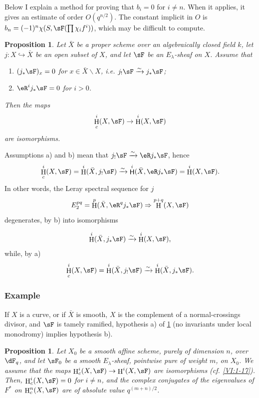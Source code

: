 \documentclass[oneside]{book}
\DeclareMathOperator{\h}{H}
\DeclareMathOperator{\hh}{\mathsf{H}} %
\newcommand{\iso}{\xrightarrow\sim}
\renewcommand{\setminus}{\smallsetminus}
\theoremstyle{sga-source}
\theoremstyle{sga-source-dash}
\theoremstyle{sga-source-dotdash}
\theoremstyle{sga-source-number-note-dash}
\theoremstyle{sga-source-note-number-dotdash}
\theoremstyle{sga-source-example-dotdash}
\theoremstyle{sga-source-inline-number}
\theoremstyle{sga-source-bare-number}
\theoremstyle{sga-source}
\newtheorem{proposition_}[subsection]{Proposition}
\newcommand{\PrintPage}[1]{}\newcommand{\MathPage}[1]{}\newcommand{\PrintCite}[2]{#1}\newcommand{\var}[3]{#1}
\begin{document}
Below I explain a method for proving that $b_i=0$ for $i\ne n$. 
When it applies, it gives an estimate of order $O(q^{n/2})$. The constant 
implicit in $O$ is $b_n=(-1)^n \chi(S,\sF(\prod \chi_i f^i))$, which may 
be difficult to compute. 





\begin{proposition_}\label{VI:1-19}
Let $\bar X$ be a proper scheme over an algebraically closed field $k$, 
let $j:X\hookrightarrow \bar X$ be \var{an open subset of $X$}{an open subset of $\bar X$}{S45-SOL-0719}, and let $\sF$ be an $E_\lambda$-sheaf 
on $X$. Assume that 
\begin{enumerate}[\indent a)]
  \item $(j_\ast\sF)_x = 0$ for $x\in \bar X\setminus X$, i.e. 
    $j_!\sF\iso j_\ast\sF$; 
  \item $\eR^i j_\ast \sF = 0$ for $i>0$.
\end{enumerate}
Then the maps 
\[
  \h_c^i(X,\sF) \to \h^i(X,\sF)
\]
are isomorphisms. 
\end{proposition_}

Assumptions a) and b) mean that $j_! \sF \iso \eR j_\ast \sF$, hence 
\[
  \h_c^i(X,\sF) = \h^i(\bar X,j_!\sF) \iso \hh^i(\bar X,\eR j_\ast \sF) = \h^i(X,\sF) \text{.}
\]
In other words, the Leray spectral sequence for $j$ 
\[
  E_2^{pq} = \h^p(\bar X,\eR^q j_\ast \sF) \Rightarrow \h^{p+q}(X,\sF) 
\]
degenerates, by b) into isomorphisms 
\PrintPage{180}
\[
  \h^i(\bar X,j_\ast\sF) \iso \h^i(X,\sF) \text{,}
\]
while, by a) 
\[
  \h_c^i(X,\sF) = \h^i(\bar X,j_!\sF) \iso \h^i(\bar X,j_\ast\sF) \text{.}
\]





\subsubsection{Example}\label{VI:1-19-1}

If $X$ is a curve, or if $\bar X$ is smooth, $X$ is the complement of a 
normal-crossings divisor, and $\sF$ is tamely ramified, 
hypothesis a) of \ref{VI:1-19} (no invariants under local monodromy) 
implies hypothesis b). 





\begin{proposition_}\label{VI:1-20}
Let $X_0$ be a smooth affine scheme, purely of dimension $n$, over $\dF_q$, and let 
$\sF_0$ be a smooth $E_\lambda$-sheaf, pointwise pure of weight $m$, on $X_0$. We 
assume that the maps $\h_c^i(X,\sF) \to \h^i(X,\sF)$ are 
isomorphisms \var{(cf. \ref{VI:1-17})}{(cf. \ref{VI:1-19})}{S45-SOL-0721}. Then, $\h_c^i(X,\sF) = 0$ for $i\ne n$, and 
the complex conjugates of the eigenvalues of $F^\ast$ on $\h_c^n(X,\sF)$ 
are of absolute value $q^{(m+n)/2}$. 
\end{proposition_}
\end{document}
